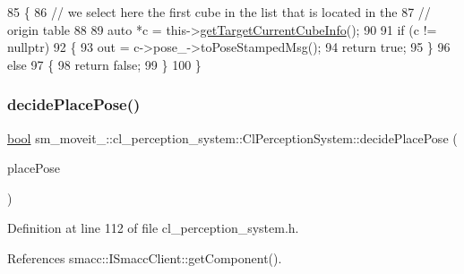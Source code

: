 \begin{DoxyCode}
85             \{
86                 \textcolor{comment}{// we select here the first cube in the list that is located in the}
87                 \textcolor{comment}{// origin table}
88 
89                 \textcolor{keyword}{auto} *c = this->\hyperlink{classsm__moveit__4_1_1cl__perception__system_1_1ClPerceptionSystem_ac4b944cebb2055a85a33129665df5dcf}{getTargetCurrentCubeInfo}();
90 
91                 \textcolor{keywordflow}{if} (c != \textcolor{keyword}{nullptr})
92                 \{
93                     out = c->pose\_->toPoseStampedMsg();
94                     \textcolor{keywordflow}{return} \textcolor{keyword}{true};
95                 \}
96                 \textcolor{keywordflow}{else}
97                 \{
98                     \textcolor{keywordflow}{return} \textcolor{keyword}{false};
99                 \}
100             \}
\end{DoxyCode}
\mbox{\label{classsm__moveit__4_1_1cl__perception__system_1_1ClPerceptionSystem_af6ff9a225d451bdee312573296ed02a8}} 
\subsubsection{\texorpdfstring{decide\+Place\+Pose()}{decidePlacePose()}}
{\footnotesize\ttfamily \hyperlink{classbool}{bool} sm\+\_\+moveit\+\_\+::cl\+\_\+perception\+\_\+system\+::\+Cl\+Perception\+System\+::decide\+Place\+Pose (\begin{DoxyParamCaption}\item[{geometry\+\_\+msgs\+::\+Pose\+Stamped \&}]{place\+Pose }\end{DoxyParamCaption})\hspace{0.3cm}{\ttfamily [inline]}}



Definition at line 112 of file cl\+\_\+perception\+\_\+system.\+h.



References smacc\+::\+I\+Smacc\+Client\+::get\+Component().


